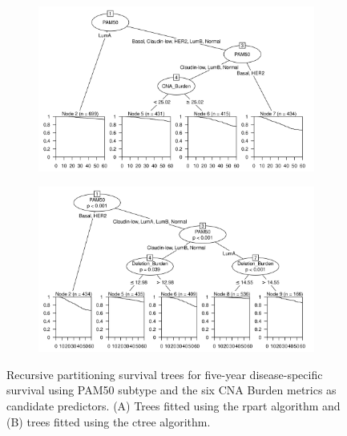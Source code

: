 \begin{figure}[!h]
\centering

\vspace{0.5cm}

\begin{subfigure}{\textwidth}
\subcaption{}
\includegraphics[width=1\textwidth]{../figures/Chapter_3/PartyKit_Survival_Burden_FiveYearDSS_PAM50.png}
\end{subfigure}
\vspace{2cm}


\begin{subfigure}{\textwidth}
\subcaption{}
\includegraphics[width=1\textwidth]{../figures/Chapter_3/Ctree_Survival_Burden_FiveYearDSS_PAM50.png}
\end{subfigure}
\vspace{0.5cm}

\caption[Recursive partitioning survival trees for five-year disease-specific survival using PAM50 subtype and the six CNA Burden metrics as candidate predictors.]{Recursive partitioning survival trees for five-year disease-specific survival using PAM50 subtype and the six CNA Burden metrics as candidate predictors. (A) Trees fitted using the rpart algorithm and (B) trees fitted using the ctree algorithm.}
\label{fig:PAM50_CNA_Burden_FiveYearDSS}
\end{figure}

